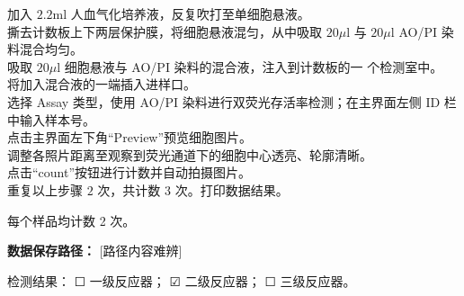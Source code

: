 \documentclass[UTF8,10pt,a4paper,fontset=fandol]{ctexart}
\newcommand{\fieldvalue}[1]{#1}
\newcommand{\handwritten}[1]{#1}
\newcommand{\checkboxfield}[1]{\ifstrequal{#1}{checked}{☑}{\ifstrequal{#1}{unclear}{?}{☐}}}
\begin{document}
\medskip
\noindent
加入 $2.2\mathrm{ml}$ 人血气化培养液，反复吹打至单细胞悬液。\\
撕去计数板上下两层保护膜，将细胞悬液混匀，从中吸取 $20\mu\mathrm{l}$ 与 $20\mu\mathrm{l}$ AO/PI 染料混合均匀。\\
吸取 $20\mu\mathrm{l}$ 细胞悬液与 AO/PI 染料的混合液，注入到计数板的一 个检测室中。\\
将加入混合液的一端插入进样口。\\
选择 Assay 类型，使用 AO/PI 染料进行双荧光存活率检测；在主界面左侧 ID 栏中输入样本号。\\
点击主界面左下角“Preview”预览细胞图片。\\
调整各照片距离至观察到荧光通道下的细胞中心透亮、轮廓清晰。\\
点击“count”按钮进行计数并自动拍摄图片。\\
重复以上步骤 $2$ 次，共计数 $3$ 次。打印数据结果。

\medskip
\noindent
每个样品均计数
\fieldvalue{\handwritten{2}}
次。

\bigskip
\noindent
\textbf{数据保存路径：}
\fieldvalue{\handwritten{[路径内容难辨]}}

\medskip
\noindent
检测结果：
\fieldvalue{\checkboxfield{unchecked}} 一级反应器；
\fieldvalue{\handwritten{\checkboxfield{checked}}} 二级反应器；
\fieldvalue{\checkboxfield{unchecked}} 三级反应器。
\end{document}
